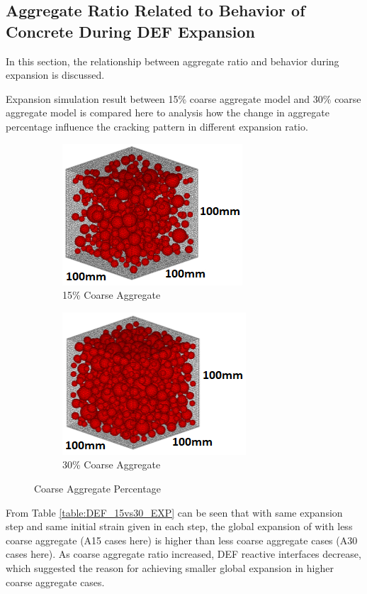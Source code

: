 \clearpage
\subsection{Aggregate Ratio Related to Behavior of Concrete During DEF Expansion}
In this section, the relationship between aggregate ratio and behavior during expansion is discussed.

Expansion simulation result between 15\% coarse aggregate model and 30\% coarse aggregate model is compared here to analysis how the change in aggregate percentage influence the cracking pattern in different expansion ratio.

\begin{figure}[!h]
\centering
\begin{subfigure}{.5\textwidth}
  \centering
  \includegraphics[width=.4\linewidth]{Files/Aggregate/A15.png}
  \caption{15\% Coarse Aggregate}
  \label{fig:A15_model}
\end{subfigure}%
\begin{subfigure}{.5\textwidth}
  \centering
  \includegraphics[width=.4\linewidth]{Files/Aggregate/A30.png}
  \caption{30\% Coarse Aggregate}
  \label{fig:A15_model}
\end{subfigure}
\caption{Coarse Aggregate Percentage}
\label{fig:Aggregate_Percentage}
\end{figure}


From Table \ref{table:DEF_15vs30_EXP} can be seen that with same expansion step and same initial strain given in each step, the global expansion of with less coarse aggregate (A15 cases here) is higher than less coarse aggregate cases (A30 cases here).  As coarse aggregate ratio increased, DEF reactive interfaces decrease, which suggested the reason for achieving smaller global expansion in higher coarse aggregate cases.

